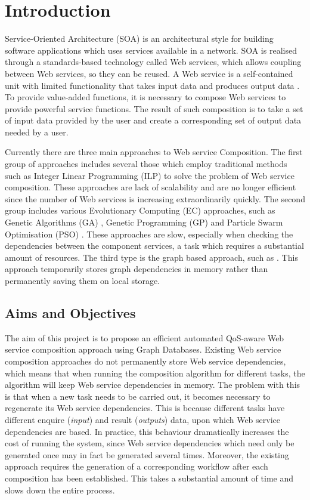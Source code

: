 \chapter{Introduction}\label{C:intro}
Service-Oriented Architecture (SOA) \cite{1} is an architectural style for building software applications which uses services available in a network. SOA is realised through a standards-based technology called Web services, which allows coupling between Web services, so they can be reused. A Web service is a self-contained unit with limited functionality that takes input data and produces output data \cite{27}. To provide value-added functions, it is necessary to compose Web services to provide powerful service functions. The result of such composition is to take a set of input data provided by the user and create a corresponding set of output data needed by a user.  

Currently there are three main approaches to Web service Composition. The first group of approaches includes several those which employ traditional methods such as Integer Linear Programming (ILP) \cite{7} to solve the problem of Web service composition. These approaches are lack of scalability and are no longer efficient since the number of Web services is increasing extraordinarily quickly. The second group includes various Evolutionary Computing (EC) approaches, such as Genetic Algorithms (GA) \cite{8}, Genetic Programming (GP) \cite{14,2,9} and Particle Swarm Optimisation (PSO) \cite{10,19}. These approaches are slow, especially when checking the dependencies between the component services, a task which requires a substantial amount of resources. The third type is the graph based approach, such as \cite{13,5}. This approach temporarily stores graph dependencies in memory rather than permanently saving them on local storage.


\section{Aims and Objectives}
The aim of this project is to propose an efficient automated QoS-aware Web service composition approach using Graph Databases. Existing Web service composition approaches \cite{2, 4} do not permanently store Web service dependencies, which means that when running the composition algorithm for different tasks, the algorithm will keep Web service dependencies in memory. The problem with this is that when a new task needs to be carried out, it becomes necessary to regenerate its Web service dependencies. This is because different tasks have different enquire (\emph{input}) and result (\emph{outputs}) data, upon which Web service dependencies are based. In practice, this behaviour dramatically increases the cost of running the system, since Web service dependencies which need only be generated once may in fact be generated several times. Moreover, the existing approach requires the generation of a corresponding workflow after each composition has been established. This takes a substantial amount of time and slows down the entire process.


